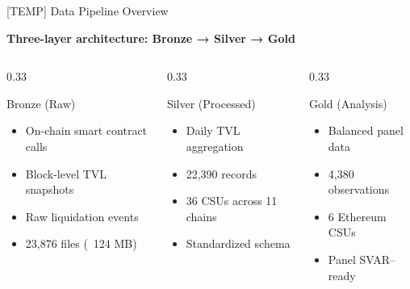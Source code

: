 
\begin{frame}{[TEMP] Data Pipeline Overview}

\textbf{Three-layer architecture: Bronze → Silver → Gold}

\vspace{0.3cm}

\begin{columns}[T]

\begin{column}{0.33\textwidth}
\begin{block}{Bronze (Raw)}
\begin{itemize}
    \item On-chain smart contract calls
    \item Block-level TVL snapshots
    \item Raw liquidation events
    \item 23,876 files (~124 MB)
\end{itemize}
\end{block}
\end{column}

\begin{column}{0.33\textwidth}
\begin{block}{Silver (Processed)}
\begin{itemize}
    \item Daily TVL aggregation
    \item 22,390 records
    \item 36 CSUs across 11 chains
    \item Standardized schema
\end{itemize}
\end{block}
\end{column}

\begin{column}{0.33\textwidth}
\begin{block}{Gold (Analysis)}
\begin{itemize}
    \item Balanced panel data
    \item 4,380 observations
    \item 6 Ethereum CSUs
    \item Panel SVAR--ready
\end{itemize}
\end{block}
\end{column}

\end{columns}

\end{frame}


